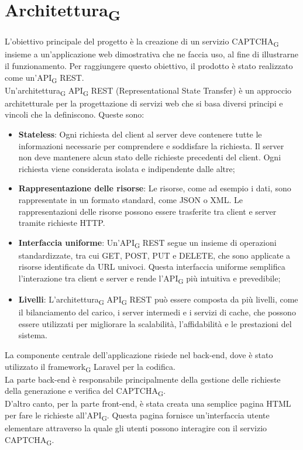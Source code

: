 \section{Architettura\textsubscript{G}}
L'obiettivo principale del progetto è la creazione di un servizio CAPTCHA\textsubscript{G} insieme a un'applicazione web 
dimostrativa che ne faccia uso, al fine di illustrarne il funzionamento. Per raggiungere questo obiettivo, 
il prodotto è stato realizzato come un'API\textsubscript{G} REST.\\
Un'architettura\textsubscript{G} API\textsubscript{G} REST (Representational State Transfer) è un approccio architetturale per la progettazione di servizi web che si basa diversi principi e vincoli che la definiscono.
Queste sono:
\begin{itemize}
	\item \textbf{Stateless}: Ogni richiesta del client al server deve contenere tutte le informazioni necessarie per comprendere e soddisfare la richiesta. Il server non deve mantenere alcun stato delle richieste precedenti del client. Ogni richiesta viene considerata isolata e indipendente dalle altre;
	\item \textbf{Rappresentazione delle risorse}: Le risorse, come ad esempio i dati, sono rappresentate in un formato standard, come JSON o XML. Le rappresentazioni delle risorse possono essere trasferite tra client e server tramite richieste HTTP.
	\item \textbf{Interfaccia uniforme}:  Un'API\textsubscript{G} REST segue un insieme di operazioni standardizzate, tra cui GET, POST, PUT e DELETE, che sono applicate a risorse identificate da URL univoci. Questa interfaccia uniforme semplifica l'interazione tra client e server e rende l'API\textsubscript{G} più intuitiva e prevedibile;
	\item \textbf{Livelli}:  L'architettura\textsubscript{G} API\textsubscript{G} REST può essere composta da più livelli, come il bilanciamento del carico, i server intermedi e i servizi di cache, che possono essere utilizzati per migliorare la scalabilità, l'affidabilità e le prestazioni del sistema.\\
\end{itemize}

La componente centrale dell'applicazione risiede nel back-end, dove è stato utilizzato il framework\textsubscript{G} Laravel per la codifica.\\
La parte back-end è responsabile principalmente della gestione delle richieste della generazione e verifica del CAPTCHA\textsubscript{G}. \\
D'altro canto, per la parte front-end, è stata creata una semplice pagina HTML per fare le richieste all'API\textsubscript{G}. Questa pagina fornisce un'interfaccia utente elementare attraverso la quale gli utenti possono interagire con il servizio CAPTCHA\textsubscript{G}.

